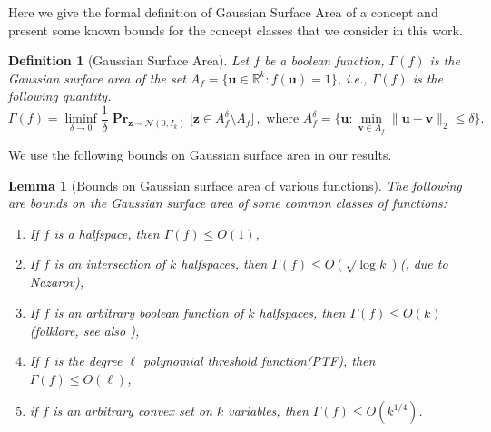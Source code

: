 \documentclass[10pt,a4paper]{article}
\newtheorem{lemma}{Lemma}[section]
\newtheorem{definition}{Definition}[section]
\newcommand\twonorm[1]{\|#1\|_2}
\renewcommand\vec[1]{\mathbf{#1}}
\DeclareMathOperator*{\pr}{\mathbf{Pr}}
\newcommand{\R}{\mathbb{R}}
\newcommand{\1}{\Ind}
\newcommand{\vv}{\vec v}
\newcommand{\vu}{\vec u}
\newcommand{\z}{\vec z}
\newcommand{\Gauss}{\mathcal{N}}
\begin{document}
Here we give the formal definition of Gaussian Surface Area of a concept and present some known
bounds for the concept classes that we consider in this work.

\begin{definition}[Gaussian Surface Area]
\label{def:GSA}
Let $f$ be a boolean function, $\Gamma(f)$ is the Gaussian surface area of the set $A_f = \{\vu\in \R^k: f(\vu) = 1\}$, i.e., $\Gamma(f)$ is the following quantity.
\[
    \Gamma(f) = \liminf_{\delta \to 0} \frac{1}{\delta} \pr_{\z\sim\Gauss(0,I_k)}\bigr[\z \in A_f^\delta \setminus A_f\bigr]\,, \text{ where }A_f^\delta = \{\vu: \min_{\vv\in A_f}\twonorm{\vu-\vv} \le \delta\}.
\]
\end{definition}

We use the following bounds on Gaussian surface area in our results.
\begin{lemma}[Bounds on Gaussian surface area of various functions]
\label{lem:gsa_bounds}
The following are bounds on the Gaussian surface area of some common classes of functions:
\begin{enumerate}
    \item If $f$ is a halfspace, then $\Gamma(f)\leq O(1)$\cite{KOS:08},
    \item If $f$ is an intersection of $k$ halfspaces, then $\Gamma(f)\leq O(\sqrt{\log k})$(\cite{KOS:08}, due to Nazarov),
    \item If $f$ is an arbitrary boolean function of $k$ halfspaces, then $\Gamma(f)\leq O(k)$
    (folklore, see also ),
    \item If $f$ is the degree $\ell$ polynomial threshold function(PTF), then $\Gamma(f)\leq O(\ell)$\cite{Kane11},
    \item if $f$ is an arbitrary convex set on $k$ variables, then $\Gamma(f)\leq O(k^{1/4})$\cite{Ball:93}.
\end{enumerate}
\end{lemma}
\end{document}
